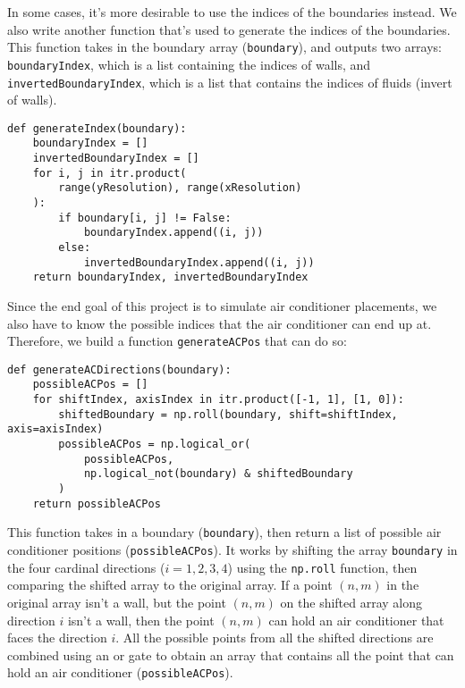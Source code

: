 In some cases, it's more desirable to use the indices of the boundaries instead. We also write another function that's used to generate the indices of the boundaries. This function takes in the boundary array (\texttt{boundary}), and outputs two arrays: \texttt{boundaryIndex}, which is a list containing the indices of walls, and \texttt{invertedBoundaryIndex}, which is a list that contains the indices of fluids (invert of walls).
\begin{verbatim}
def generateIndex(boundary):
    boundaryIndex = []
    invertedBoundaryIndex = []
    for i, j in itr.product(
        range(yResolution), range(xResolution)
    ):
        if boundary[i, j] != False:
            boundaryIndex.append((i, j))
        else:
            invertedBoundaryIndex.append((i, j))
    return boundaryIndex, invertedBoundaryIndex
\end{verbatim}

Since the end goal of this project is to simulate air conditioner placements, we also have to know the possible indices that the air conditioner can end up at. Therefore, we build a function \texttt{generateACPos} that can do so:
\begin{verbatim}
def generateACDirections(boundary):
    possibleACPos = []
    for shiftIndex, axisIndex in itr.product([-1, 1], [1, 0]):
        shiftedBoundary = np.roll(boundary, shift=shiftIndex, axis=axisIndex)
        possibleACPos = np.logical_or(
            possibleACPos,
            np.logical_not(boundary) & shiftedBoundary
        )
    return possibleACPos
\end{verbatim}
This function takes in a boundary (\texttt{boundary}), then return a list of possible air conditioner positions (\texttt{possibleACPos}). It works by shifting the array \texttt{boundary} in the four cardinal directions ($i = 1, 2, 3, 4$) using the \texttt{np.roll} function, then comparing the shifted array to the original array. If a point $(n, m)$ in the original array isn't a wall, but the point $(n, m)$ on the shifted array along direction $i$ isn't a wall, then the point $(n, m)$ can hold an air conditioner that faces the direction $i$. All the possible points from all the shifted directions are combined using an or gate to obtain an array that contains all the point that can hold an air conditioner (\texttt{possibleACPos}).

